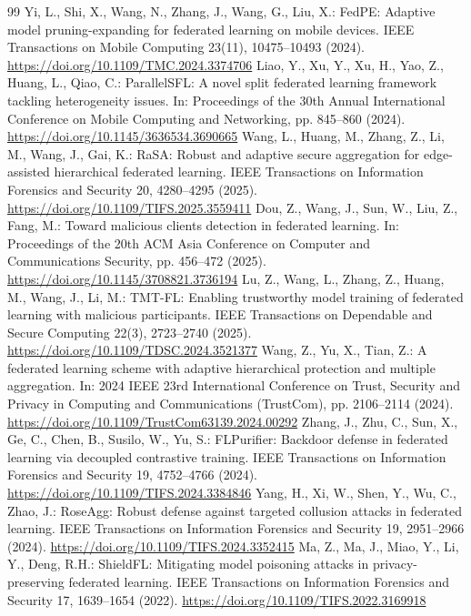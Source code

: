 \documentclass[11pt, a4paper]{article}
\begin{document}
\begin{thebibliography}{99}
     Yi, L., Shi, X., Wang, N., Zhang, J., Wang, G., Liu, X.: FedPE: Adaptive model pruning-expanding for federated learning on mobile devices. IEEE Transactions on Mobile Computing 23(11), 10475--10493 (2024). \url{https://doi.org/10.1109/TMC.2024.3374706}
     Liao, Y., Xu, Y., Xu, H., Yao, Z., Huang, L., Qiao, C.: ParallelSFL: A novel split federated learning framework tackling heterogeneity issues. In: Proceedings of the 30th Annual International Conference on Mobile Computing and Networking, pp. 845--860 (2024). \url{https://doi.org/10.1145/3636534.3690665}
     Wang, L., Huang, M., Zhang, Z., Li, M., Wang, J., Gai, K.: RaSA: Robust and adaptive secure aggregation for edge-assisted hierarchical federated learning. IEEE Transactions on Information Forensics and Security 20, 4280--4295 (2025). \url{https://doi.org/10.1109/TIFS.2025.3559411}
     Dou, Z., Wang, J., Sun, W., Liu, Z., Fang, M.: Toward malicious clients detection in federated learning. In: Proceedings of the 20th ACM Asia Conference on Computer and Communications Security, pp. 456--472 (2025). \url{https://doi.org/10.1145/3708821.3736194}
     Lu, Z., Wang, L., Zhang, Z., Huang, M., Wang, J., Li, M.: TMT-FL: Enabling trustworthy model training of federated learning with malicious participants. IEEE Transactions on Dependable and Secure Computing 22(3), 2723--2740 (2025). \url{https://doi.org/10.1109/TDSC.2024.3521377}
     Wang, Z., Yu, X., Tian, Z.: A federated learning scheme with adaptive hierarchical protection and multiple aggregation. In: 2024 IEEE 23rd International Conference on Trust, Security and Privacy in Computing and Communications (TrustCom), pp. 2106--2114 (2024). \url{https://doi.org/10.1109/TrustCom63139.2024.00292}
     Zhang, J., Zhu, C., Sun, X., Ge, C., Chen, B., Susilo, W., Yu, S.: FLPurifier: Backdoor defense in federated learning via decoupled contrastive training. IEEE Transactions on Information Forensics and Security 19, 4752--4766 (2024). \url{https://doi.org/10.1109/TIFS.2024.3384846}
     Yang, H., Xi, W., Shen, Y., Wu, C., Zhao, J.: RoseAgg: Robust defense against targeted collusion attacks in federated learning. IEEE Transactions on Information Forensics and Security 19, 2951--2966 (2024). \url{https://doi.org/10.1109/TIFS.2024.3352415}
     Ma, Z., Ma, J., Miao, Y., Li, Y., Deng, R.H.: ShieldFL: Mitigating model poisoning attacks in privacy-preserving federated learning. IEEE Transactions on Information Forensics and Security 17, 1639--1654 (2022). \url{https://doi.org/10.1109/TIFS.2022.3169918}

\end{thebibliography}
\end{document}
